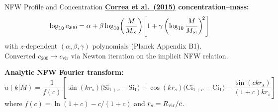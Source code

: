 \begin{frame}{NFW Profile and Concentration}
\textbf{\href{https://arxiv.org/abs/1502.00391}{Correa et al.\ (2015)} concentration--mass:}
\begin{equation}
\log_{10} c_{200} = \alpha + \beta\log_{10}\!\left(\frac{M}{M_\odot}\right)\!\left[1 + \gamma\left(\log_{10}\frac{M}{M_\odot}\right)^{\!2}\right]
\end{equation}
with $z$-dependent $(\alpha,\beta,\gamma)$ polynomials (Planck Appendix B1).\\
Converted $c_{200} \to c_{\mathrm{vir}}$ via Newton iteration on the implicit NFW relation.

\vspace{0.3cm}
\textbf{Analytic NFW Fourier transform:}
\begin{equation}
\tilde{u}(k|M) = \frac{1}{f(c)}\left[\sin(kr_s)\bigl(\mathrm{Si}_{1{+}c} - \mathrm{Si}_1\bigr) + \cos(kr_s)\bigl(\mathrm{Ci}_{1{+}c} - \mathrm{Ci}_1\bigr) - \frac{\sin(ckr_s)}{(1{+}c)kr_s}\right]
\end{equation}
where $f(c) = \ln(1+c) - c/(1+c)$ and $r_s = R_{\mathrm{vir}}/c$.
\end{frame}
